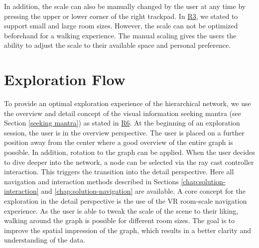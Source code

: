 In addition, the scale can also be manually changed by the user at any time by pressing the upper or lower corner of the right trackpad. 
In \hyperref[req:R3]{R3}, we stated to support small and large room sizes.  However, the scale can not be optimized beforehand for a walking experience. The manual scaling gives the users the ability to adjust the scale to their available space and personal preference.
\section{Exploration Flow}
\label{chap:ps-explorationFlow}
To provide an optimal exploration experience of the hierarchical network, we use the overview and detail concept of the visual information seeking mantra (see Section \ref{seeking mantra}) as stated in \hyperref[req:R6]{R6}. 
At the beginning of an exploration session, the user is in the overview perspective. The user is placed on a further position away from the center where a good overview of the entire graph is possible. In addition, rotation to the graph can be applied.
When the user decides to dive deeper into the network, a node can be selected via the ray cast controller interaction. This triggers the transition into the detail perspective. 
Here all navigation and interaction methods described in Sections \ref{chap:solution-interaction} and \ref{chap:solution-navigation}
are available. 
A core concept for the exploration in the detail perspective is the use of the VR room-scale navigation experience. As the user is able to tweak the scale of the scene to their liking, walking around the graph is possible for different room sizes. The goal is to improve the spatial impression of the graph, which results in a better clarity and understanding of the data.
